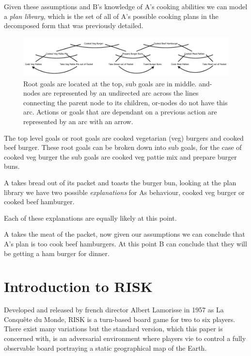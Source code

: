 \documentclass[parskip]{cs4rep}
\begin{document}
Given these assumptions and B's knowledge of A's cooking abilities we can model a \textit{plan library}, which is the set of all of A's possible cooking plans in the decomposed form that was previously detailed.

\begin{figure}[h]
\centering
\includegraphics{images/example-plan-recognition}
\caption{Root goals are located at the top, sub goals are in middle. and-nodes are represented by an undirected arc across the lines connecting the parent node to its children, or-nodes do not have this arc. Actions or goals that are dependant on a previous action are represented by an arc with an arrow.}
\label{fig:example-plan-library}
\end{figure} 

The top level goals or root goals are cooked vegetarian (veg) burgers and cooked beef burger. These root goals can be broken down into sub goals, for the case of cooked veg burger the sub goals are cooked veg pattie mix and prepare burger buns.

A takes bread out of its packet and toasts the burger bun, looking at the plan library we have two possible \textit{explanations} for As behaviour, cooked veg burger or cooked beef hamburger.

Each of these explanations are equally likely at this point.

A takes the meat of the packet, now given our assumptions we can conclude that A's plan is too cook beef hamburgers. At this point B can conclude that they will be getting a ham burger for dinner.

\newpage

\section{Introduction to RISK}

Developed and released by french director Albert Lamorisse in 1957 as La Conqu\^ete du Monde, RISK is a turn-based board game for two to six players. There exist many variations but the standard version, which this paper is concerned with, is an adversarial environment where players vie to control a fully observable board portraying a static geographical map of the Earth.
\end{document}
